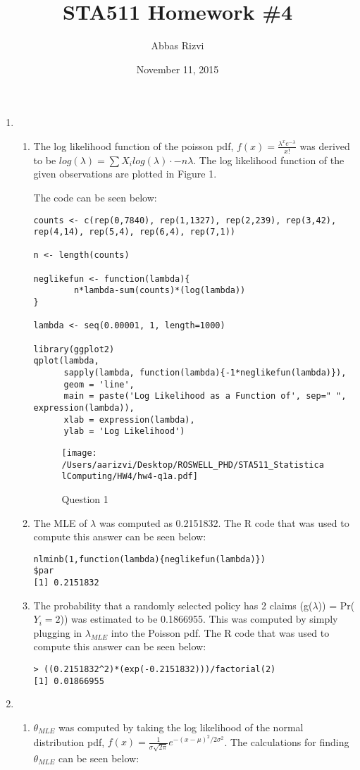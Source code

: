 \documentclass[letterpaper]{article}
\begin{document}


\title{STA511 Homework \#4}
\date{November 11, 2015}
\author{Abbas Rizvi}
\maketitle

\begin{enumerate}
\item 
\begin{enumerate}
\item The log likelihood function of the poisson pdf, $f(x) = \frac{\lambda^{x}e^{-\lambda}}{x!}$ was derived to be $log(\lambda) = \sum X_{i} log(\lambda) \cdot -n\lambda$. The log likelihood function of the given observations are plotted in Figure 1. 

The code can be seen below:

\begin{verbatim}
counts <- c(rep(0,7840), rep(1,1327), rep(2,239), rep(3,42), rep(4,14), rep(5,4), rep(6,4), rep(7,1))

n <- length(counts)

neglikefun <- function(lambda){
        n*lambda-sum(counts)*(log(lambda))
}

lambda <- seq(0.00001, 1, length=1000)

library(ggplot2)
qplot(lambda, 
      sapply(lambda, function(lambda){-1*neglikefun(lambda)}),
      geom = 'line',
      main = paste('Log Likelihood as a Function of', sep=" ", expression(lambda)),
      xlab = expression(lambda),
      ylab = 'Log Likelihood')
\end{verbatim}
\begin{figure}
\centering
\caption{Question 1}
\centering
\texttt{[image: /Users/aarizvi/Desktop/ROSWELL\_PHD/STA511\_StatisticalComputing/HW4/hw4-q1a.pdf]}
\end{figure}
\item The MLE of $\lambda$ was computed as 0.2151832. The R code that was used to compute this answer can be seen below:

\begin{verbatim}
nlminb(1,function(lambda){neglikefun(lambda)})
$par
[1] 0.2151832
\end{verbatim}

\item The probability that a randomly selected policy has 2 claims (g($\lambda$)) = Pr($Y_{i} = 2$)) was estimated to be 0.1866955. This was computed by simply plugging in $\lambda_{MLE}$ into the Poisson pdf. The R code that was used to compute this answer can be seen below:
\begin{verbatim}
> ((0.2151832^2)*(exp(-0.2151832)))/factorial(2)
[1] 0.01866955
\end{verbatim}
\end{enumerate}
\item
\begin{enumerate}
\item $\theta_{MLE}$ was computed by taking the log likelihood of the normal distribution pdf, $f(x) = \frac{1}{\sigma\sqrt{2\pi}}e^{-(x-\mu)^{2}/2\sigma^{2}}$. The calculations for finding $\theta_{MLE}$ can be seen below: 


\end{enumerate}
\end{enumerate}
\end{document}
